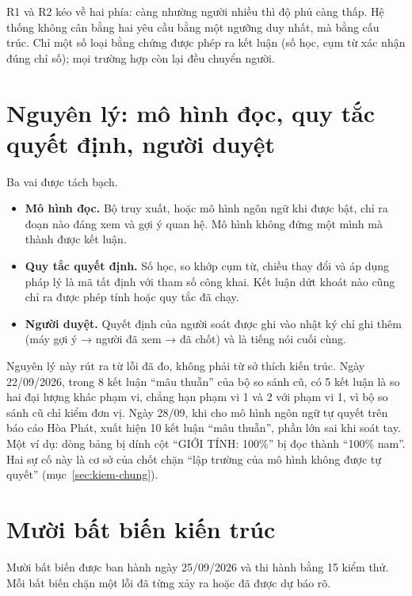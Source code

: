 R1 và R2 kéo về hai phía: càng nhường người nhiều thì độ phủ càng thấp. Hệ thống không cân bằng hai yêu cầu bằng một ngưỡng duy nhất, mà bằng cấu trúc. Chỉ một số loại bằng chứng được phép ra kết luận (số học, cụm từ xác nhận đúng chỉ số); mọi trường hợp còn lại đều chuyển người.

\section{Nguyên lý: mô hình đọc, quy tắc quyết định, người duyệt}

Ba vai được tách bạch.
\begin{itemize}
\item \textbf{Mô hình đọc.} Bộ truy xuất, hoặc mô hình ngôn ngữ khi được bật, chỉ ra đoạn nào đáng xem và gợi ý quan hệ. Mô hình không đứng một mình mà thành được kết luận.
\item \textbf{Quy tắc quyết định.} Số học, so khớp cụm từ, chiều thay đổi và áp dụng pháp lý là mã tất định với tham số công khai. Kết luận dứt khoát nào cũng chỉ ra được phép tính hoặc quy tắc đã chạy.
\item \textbf{Người duyệt.} Quyết định của người soát được ghi vào nhật ký chỉ ghi thêm (máy gợi ý → người đã xem → đã chốt) và là tiếng nói cuối cùng.
\end{itemize}

Nguyên lý này rút ra từ lỗi đã đo, không phải từ sở thích kiến trúc. Ngày 22/09/2026, trong 8 kết luận “mâu thuẫn” của bộ so sánh cũ, có 5 kết luận là so hai đại lượng khác phạm vi, chẳng hạn phạm vi 1 và 2 với phạm vi 1, vì bộ so sánh cũ chỉ kiểm đơn vị. Ngày 28/09, khi cho mô hình ngôn ngữ tự quyết trên báo cáo Hòa Phát, xuất hiện 10 kết luận “mâu thuẫn”, phần lớn sai khi soát tay. Một ví dụ: dòng bảng bị dính cột “GIỚI TÍNH: 100\%” bị đọc thành “100\% nam”. Hai sự cố này là cơ sở của chốt chặn “lập trường của mô hình không được tự quyết” (mục~\ref{sec:kiem-chung}).

\section{Mười bất biến kiến trúc}

Mười bất biến được ban hành ngày 25/09/2026 và thi hành bằng 15 kiểm thử. Mỗi bất biến chặn một lỗi đã từng xảy ra hoặc đã được dự báo rõ.

